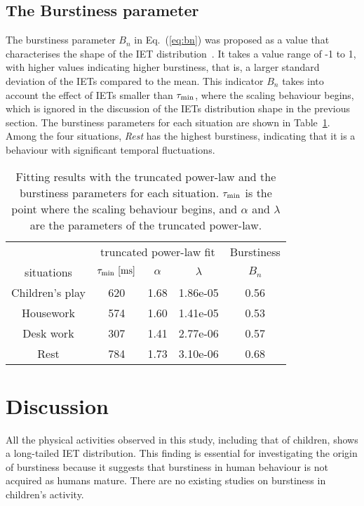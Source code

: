 \documentclass{bmcart}
\begin{document}
\subsection{The Burstiness parameter}
The burstiness parameter $B_n$ in Eq.~(\ref{eq:bn}) was proposed as a value that characterises the shape of the IET distribution~\cite{Goh_2008, PhysRevE.94.032311}. It takes a value range of -1 to 1, with higher values indicating higher burstiness, that is, a larger standard deviation of the IETs compared to the mean. This indicator $B_n$  takes into account the effect of IETs smaller than $\tau_{\rm min}$, where the scaling behaviour begins, which is ignored in the discussion of the IETs distribution shape in the previous section. The burstiness parameters for each situation are shown in Table~\ref{table:result}. Among the four situations, \textit{Rest} has the highest burstiness, indicating that it is a behaviour with significant temporal fluctuations.


\begin{table}[ht]
\caption{Fitting results with the truncated power-law and the burstiness parameters for each situation. $\tau_{\rm min}$ is the point where the scaling behaviour begins, and $\alpha$ and $\lambda$ are the parameters of the truncated power-law.}
      \begin{tabular}{c|ccc|c}
        \hline
         & \multicolumn{3}{c|}{truncated power-law fit} & Burstiness \\ 
        situations   & $\tau_{\rm min}~[\si{\milli\second}]$ & $\alpha$ & $\lambda$ & $B_n$ \\  \hline
        Children's play & 620 & 1.68 & 1.86e-05 & 0.56 \\
        Housework & 574 & 1.60 & 1.41e-05 & 0.53  \\
        Desk work & 307 & 1.41 & 2.77e-06 & 0.57  \\ 
        Rest & 784 & 1.73 & 3.10e-06 & 0.68  \\ 
        \hline
      \end{tabular}
      \label{table:result}
\end{table}





\section{Discussion}
All the physical activities observed in this study, including that of children, shows a long-tailed IET distribution. This ﬁnding is essential for investigating the origin of burstiness because it suggests that burstiness in human behaviour is not acquired as humans mature. There are no existing studies on burstiness in children's activity. 
\end{document}
